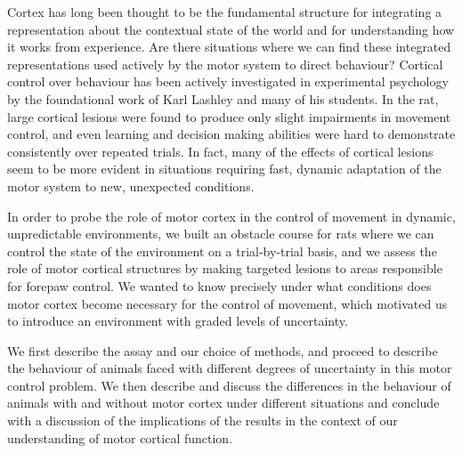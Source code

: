 Cortex has long been thought to be the fundamental structure for integrating a representation about the contextual state of the world and for understanding how it works from experience. Are there situations where we can find these integrated representations used actively by the motor system to direct behaviour? Cortical control over behaviour has been actively investigated in experimental psychology by the foundational work of Karl Lashley and many of his students. In the rat, large cortical lesions were found to produce only slight impairments in movement control, and even learning and decision making abilities were hard to demonstrate consistently over repeated trials. In fact, many of the effects of cortical lesions seem to be more evident in situations requiring fast, dynamic adaptation of the motor system to new, unexpected conditions.

In order to probe the role of motor cortex in the control of movement in dynamic, unpredictable environments, we built an obstacle course for rats where we can control the state of the environment on a trial-by-trial basis, and we assess the role of motor cortical structures by making targeted lesions to areas responsible for forepaw control. We wanted to know precisely under what conditions does motor cortex become necessary for the control of movement, which motivated us to introduce an environment with graded levels of uncertainty.

We first describe the assay and our choice of methods, and proceed to describe the behaviour of animals faced with different degrees of uncertainty in this motor control problem. We then describe and discuss the differences in the behaviour of animals with and without motor cortex under different situations and conclude with a discussion of the implications of the results in the context of our understanding of motor cortical function.
